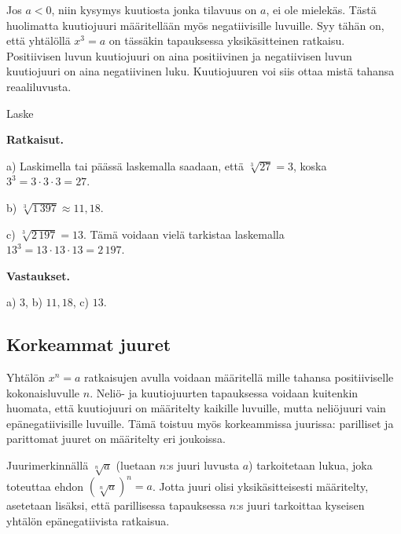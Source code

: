 
Jos $a<0$, niin kysymys kuutiosta jonka tilavuus on $a$, ei ole mielekäs. Tästä huolimatta kuutiojuuri määritellään myös negatiivisille luvuille. Syy tähän on, että yhtälöllä $x^3=a$ on tässäkin tapauksessa yksikäsitteinen ratkaisu. Positiivisen luvun kuutiojuuri on aina positiivinen ja negatiivisen luvun kuutiojuuri on aina negatiivinen luku. Kuutiojuuren voi siis ottaa mistä tahansa reaaliluvusta.


\begin{esimerkki}
Laske
\begin{alakohdat}


\end{alakohdat}

{\bf Ratkaisut.}

a)
Laskimella tai päässä laskemalla saadaan, että $\sqrt[3]{27} = 3$, koska  $3^3 =3\cdot 3\cdot 3=27$.

b) 
$\sqrt[3]{1\,397}\approx 11,18$. 

c)
$\sqrt[3]{2\,197}=13$.
Tämä voidaan vielä tarkistaa laskemalla $13^3 = 13\cdot 13\cdot 13=2\,197$.

{\bf Vastaukset.}

a) $3$, b) $11,18$, c) $13$.
\end{esimerkki}


\subsection*{Korkeammat juuret}


Yhtälön $x^n=a$ ratkaisujen avulla voidaan määritellä   mille tahansa positiiviselle kokonaisluvulle $n$. Neliö- ja kuutiojuurten tapauksessa voidaan kuitenkin huomata, että kuutiojuuri on määritelty kaikille luvuille, mutta neliöjuuri vain epänegatiivisille luvuille. Tämä toistuu myös korkeammissa juurissa: parilliset ja parittomat juuret on määritelty eri joukoissa.

Juurimerkinnällä $\sqrt[n]{a}$ (luetaan $n$:s juuri luvusta $a$) tarkoitetaan lukua, joka toteuttaa ehdon $(\sqrt[n]{a})^n = a$. Jotta juuri olisi yksikäsitteisesti määritelty, asetetaan lisäksi, että parillisessa tapauksessa $n$:s juuri tarkoittaa kyseisen yhtälön epänegatiivista ratkaisua.



